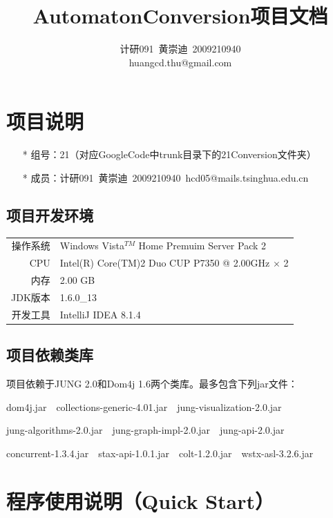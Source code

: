 \documentclass[12pt,a4paper]{article}
\author{计研091~黄崇迪~2009210940\\huangcd.thu@gmail.com}
\title{AutomatonConversion项目文档}
\begin{document}
\begin{CJK}{UTF8}{hei}
    \maketitle
\end{CJK}
\begin{CJK}{UTF8}{song}
    \tableofcontents
    \newpage

    \section{项目说明}
    
    \begin{enumerate}
    \item[*] 组号：21（对应GoogleCode中trunk目录下的21Conversion文件夹）
    \item[*] 成员：计研091~黄崇迪~2009210940~hcd05@mails.tsinghua.edu.cn
    \end{enumerate}

    \subsection{项目开发环境}

    \begin{tabular}{r|l}
    \hline
    操作系统 & Windows Vista$^{TM}$ Home Premuim Server Pack 2\\
    CPU & Intel(R) Core(TM)2 Duo CUP P7350 @ 2.00GHz $\times$ 2\\
    内存 & 2.00 GB\\
    JDK版本 & 1.6.0\_13\\
    开发工具 & IntelliJ IDEA 8.1.4\\
    \hline
    \end{tabular}

    \subsection{项目依赖类库}
    项目依赖于JUNG 2.0和Dom4j 1.6两个类库。最多包含下列jar文件：

    dom4j.jar~~collections-generic-4.01.jar~~jung-visualization-2.0.jar

    jung-algorithms-2.0.jar~~jung-graph-impl-2.0.jar~~jung-api-2.0.jar

    concurrent-1.3.4.jar~~stax-api-1.0.1.jar~~colt-1.2.0.jar~~wstx-asl-3.2.6.jar

    \section{程序使用说明（Quick Start）}


\end{CJK}
\end{document}
